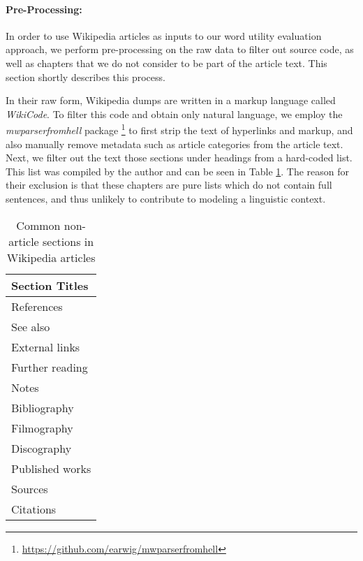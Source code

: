 

\paragraph{Pre-Processing:} \label{sec:wikipedia-preprocessing}
In order to use Wikipedia articles as inputs to our word utility evaluation approach, we perform pre-processing on the raw data to filter out source code, as well as chapters that we do not consider to be part of the article text.
This section shortly describes this process.

In their raw form, Wikipedia dumps are written in a markup language called \textit{WikiCode}.
To filter this code and obtain only natural language, we employ the \textit{mwparserfromhell} package \footnote{\url{https://github.com/earwig/mwparserfromhell}} to first strip the text of hyperlinks and markup, and also manually remove metadata such as article categories from the article text.
Next, we filter out the text those sections under headings from a hard-coded list.
This list was compiled by the author and can be seen in Table \ref{tbl:wikipedia-ignored-headings}.
The reason for their exclusion is that these chapters are pure lists which do not contain full sentences, and thus unlikely to contribute to modeling a linguistic context.

\begin{table}[H]
	\centering
	\begin{tabular}{|l|}
		\hline
		\textbf{Section Titles} \\
		\hline
		References              \\
		See also                \\
		External links          \\
		Further reading         \\
		Notes                   \\
		Bibliography            \\
		Filmography             \\
		Discography             \\
		Published works         \\
		Sources                 \\
		Citations               \\
		\hline
	\end{tabular}
	\caption{Common non-article sections in Wikipedia articles}
	\label{tbl:wikipedia-ignored-headings}
\end{table}

